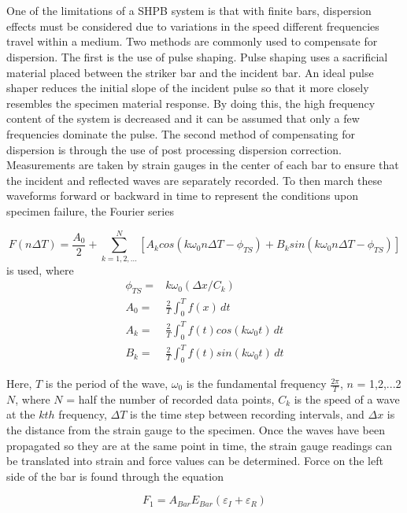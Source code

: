 \documentclass[12pt]{article}
\begin{document}
\\ \\
One of the limitations of a SHPB system is that with finite bars, dispersion effects must be considered due to variations in the speed different frequencies travel within a medium. Two methods are commonly used to compensate for dispersion. The first is the use of pulse shaping. Pulse shaping uses a sacrificial material placed between the striker bar and the incident bar. An ideal pulse shaper reduces the initial slope of the incident pulse so that it more closely resembles the specimen material response. By doing this, the high frequency content of the system is decreased and it can be assumed that only a few frequencies dominate the pulse. The second method of compensating for dispersion is through the use of post processing dispersion correction. Measurements are taken by strain gauges in the center of each bar to ensure that the incident and reflected waves are separately recorded. To then march these waveforms forward or backward in time to represent the conditions upon specimen failure, the Fourier series

\begin{equation}
F(n\Delta T) = \frac{A_0}{2} + \sum\limits_{k=1,2,...}^N [A_k cos(k \omega_0 n \Delta T - \phi_{TS}) + B_k sin(k\omega_0 n\Delta T - \phi_{TS})]
\end{equation}
is used, where 
\begin{align*}
\phi_{TS} =& k\omega_0(\Delta x/C_k) \\
A_0 =& \frac{2}{T} \int_0^T \! f(x) \, dt\\
A_k =& \frac{2}{T} \int_0^T \! f(t)cos(k\omega_0t) \, dt\\
B_k =& \frac{2}{T} \int_0^T \! f(t)sin(k\omega_0t) \, dt
\end{align*}

Here, $T$ is the period of the wave, $\omega_0$ is the fundamental frequency $\frac{2\pi}{T}$, $n$ = 1,2,...2$N$, where $N$ = half the number of recorded data points, $C_k$ is the speed of a wave at the $kth$ frequency, $\Delta T$ is the time step between recording intervals, and $\Delta x$ is the distance from the strain gauge to the specimen\cite{Gama}. Once the waves have been propagated so they are at the same point in time, the strain gauge readings can be translated into strain and force values can be determined. Force on the left side of the bar is found through the equation 

\begin{equation}
F_1 = A_{Bar}E_{Bar}(\varepsilon_I + \varepsilon_R)
\end{equation}
\end{document}
